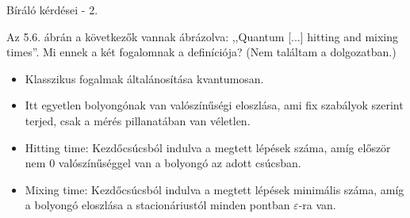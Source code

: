 \documentclass[aspectratio=169]{beamer}
\begin{document}
\begin{frame}{Bíráló kérdései - 2.}

Az 5.6. ábrán a következők vannak ábrázolva: ,,Quantum [...] hitting and mixing times''. Mi ennek a két fogalomnak a definíciója? (Nem találtam a dolgozatban.)

\begin{itemize}
  \item Klasszikus fogalmak általánosítása kvantumosan.
  \item Itt egyetlen bolyongónak van valószínűségi eloszlása, ami fix szabályok szerint terjed, csak a mérés pillanatában van véletlen.
  \item Hitting time: Kezdőcsúcsból indulva a megtett lépések száma, amíg először nem $0$ valószínűséggel van a bolyongó az adott csúcsban.
  \item Mixing time: Kezdőcsúcsból indulva a megtett lépések minimális száma, amíg a bolyongó eloszlása a stacionáriustól minden pontban $\varepsilon$-ra van.
\end{itemize}

\end{frame}
\end{document}
